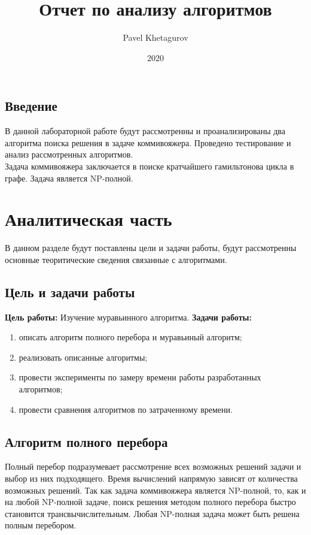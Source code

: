 \documentclass{article}
\title{Отчет по анализу алгоритмов}
\date{2020}
\author{Pavel Khetagurov}
\begin{document}
	
	\newpage
	\tableofcontents
	\newpage
	\begin{center}
	    \section*{Введение}
	\end{center}
		\indent \indent В данной лабораторной работе будут рассмотренны и проанализированы два алгоритма поиска решения в задаче коммивояжера. Проведено тестирование и анализ рассмотренных алгоритмов.
\\		\indent Задача коммивояжера заключается в поиске кратчайшего гамильтонова цикла в графе. Задача является NP-полной.
	\newpage
	\section{Аналитическая часть}
	В данном разделе будут поставлены цели и задачи работы, будут рассмотренны основные теоритические сведения связанные с алгоритмами.
		\subsection{Цель и задачи работы}
			\textbf{Цель работы:}
			\newline
			Изучение муравьинного алгоритма.
			\newline 
			\indent \textbf{Задачи работы:}
			\begin{enumerate}
				\item описать алгоритм полного перебора и муравьиный алгоритм;
				\item реализовать описанные алгоритмы;
				\item провести эксперименты по замеру времени работы разработанных алгоритмов;
				\item провести сравнения алгоритмов по затраченному времени.
			\end{enumerate}

		\subsection{Алгоритм полного перебора}
		Полный перебор подразумевает рассмотрение всех возможных решений задачи и выбор из них подходящего. Время вычислений напрямую зависят от количества возможных решений. Так как задача коммивояжера является NP-полной, то, как и на любой NP-полной задаче, поиск решения методом полного перебора быстро становится трансвычислительным. Любая NP-полная задача может быть решена полным перебором.
\end{document}
